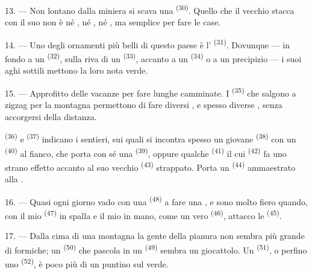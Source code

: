 13. --- Non lontano dalla miniera si scava una  \textsuperscript{(30)}.
Quello che il vecchio  stacca con il suo  non è né
, né , né , ma semplice
 per fare le case.

14. --- Uno degli ornamenti più belli di questo paese è l'
\textsuperscript{(31)}. Dovunque --- in fondo a un 
\textsuperscript{(32)}, sulla riva di un  \textsuperscript{(33)},
accanto a un  \textsuperscript{(34)} o a un precipizio --- i suoi aghi
sottili mettono la loro nota verde.

\VUsaut{3.0mm}
\VUsaut{3.0mm}

15. --- Approfitto delle vacanze per fare lunghe camminate. I 
\textsuperscript{(35)} che salgono a zigzag per la montagna permettono di fare diversi
, e spesso diverse , senza accorgersi della distanza.

 \textsuperscript{(36)} e 
\textsuperscript{(37)} indicano i sentieri, sui quali si incontra spesso un giovane
 \textsuperscript{(38)} con un 
\textsuperscript{(40)} al fianco, che porta con sé una 
\textsuperscript{(39)}, oppure qualche  \textsuperscript{(41)} il cui
 \textsuperscript{(42)} fa uno strano effetto accanto al suo vecchio
 \textsuperscript{(43)} strappato. Porta un 
\textsuperscript{(44)} ammaestrato alla .

\VUsaut{3.0mm}

16. --- Quasi ogni giorno vado con una  \textsuperscript{(48)} a fare una
, e sono molto fiero quando, con il mio 
\textsuperscript{(47)} in spalla e il mio  in mano, come un
vero  \textsuperscript{(46)}, attacco le 
\textsuperscript{(45)}.

17. --- Dalla cima di una montagna la gente della pianura non sembra più grande di
formiche; un  \textsuperscript{(50)} che pascola in un
 \textsuperscript{(49)} sembra un giocattolo. Un 
\textsuperscript{(51)}, o perfino uno  \textsuperscript{(52)},
è poco più di un puntino sul verde.


